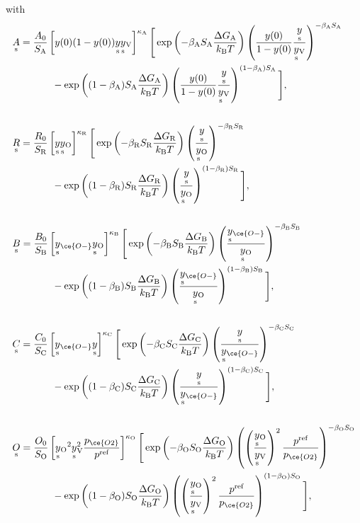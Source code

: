 \documentclass{article}
\numberwithin{equation}{section}
\newcommand{\us}[1]{\underset{\textrm{s}}{#1}{}}
\def\kB{k_\mathrm{B}}
\newcommand{\OO}{{\ce{O2}}}
\def\ys{\us y}
\newcommand{\ysV}{\us y_{\textrm{V}}}
\newcommand{\yOmin}{\us y_{\ce{O-}}}
\def\y0{{y(0)}}
\def\yOs{{\us y_\textrm{O}}}
\def\A0{A_0}
\def\B0{B_0}
\def\C0{C_0}
\def\R0{R_0}
\def\K0{O_0}
\def\DGA{\Delta G_\textrm{A}  }
\def\DGB{\Delta G_\textrm{B}  }
\def\DGC{\Delta G_\textrm{C}  }
\def\DGR{\Delta G_\textrm{R}  }
\def\DGO{\Delta G_\textrm{O}  }
\def\betaA{\beta_\textrm{A}}
\def\betaB{\beta_\textrm{B}}
\def\betaC{\beta_\textrm{C}}
\def\betaR{\beta_\textrm{R}}
\def\betaO{\beta_\textrm{O}}
\def\SA{S_\textrm{A}}
\def\SB{S_\textrm{B}}
\def\SC{S_\textrm{C}}
\def\SR{S_\textrm{R}}
\def\SO{S_\textrm{O}}
\newcommand{\kaA}{{\kappa_\textrm{A}}}
\newcommand{\kaB}{{\kappa_\textrm{B}}}
\newcommand{\kaC}{{\kappa_\textrm{C}}}
\newcommand{\kaR}{{\kappa_\textrm{R}}}
\newcommand{\kaO}{{\kappa_\textrm{O}}}
\def\REF{\textrm{ref}}
\begin{document}
with
\begin{subequations}
\begin{align}
&\us A
=
\frac{\A0}{\SA}
\left[
    y(0) (1-y(0)) \ys \ysV  
\right]^\kaA
\Bigg[
	\exp
	\left(
		{-\betaA \SA \frac{\DGA}{\kB T}}
	\right)
	\left(
		\frac{\y0}{1 - \y0}
		\frac{\ys}{\ysV}
	\right)^{-\betaA \SA}
\\ \nonumber
	&\quad \quad \quad \quad	
	-
	\exp
	\left(
		{(1-\betaA) \SA \frac{\DGA}{\kB T}}
	\right)
	\left(
		\frac{\y0}{1 - \y0 }
		\frac{\ys}{\ysV}
	\right)^{(1-\betaA) \SA}
\Bigg],
\\ \nonumber
\\
&\us R
=
\frac{\R0}{\SR}
\left[
  \ys \yOs 
\right]^\kaR
\Bigg[
	\exp
	\left(
		{-\betaR \SR \frac{\DGR}{\kB T}}
	\right)
	\left(
		\frac{\ys}{\yOs}
	\right)^{-\betaR \SR}
\\ \nonumber
	& \quad \quad \quad \quad	
	-
	\exp
	\left(
		{(1 - \betaR) \SR \frac{\DGR}{\kB T}}
	\right)
	\left(
		\frac{\ys}{\yOs}
	\right)^{(1-\betaR) \SR}
\Bigg],
\\ \nonumber
\\
&\us B
=
\frac{\B0}{\SB}
\left[
  \yOmin \yOs 
\right]^\kaB
\Bigg[
	\exp
	\left(
		{-\betaB \SB \frac{\DGB}{\kB T}}
	\right)
	\left(
		\frac{\yOmin}{\yOs}
	\right)^{-\betaB \SB}
\\ \nonumber
	& \quad \quad \quad \quad	
	-
	\exp
	\left(
		{(1 - \betaB) \SB \frac{\DGB}{\kB T}}
	\right)
	\left(
		\frac{\yOmin}{\yOs}
	\right)^{(1-\betaB) \SB}
\Bigg],
\\ \nonumber
\\
&\us C
=
\frac{\C0}{\SC}
\left[
  \yOmin \ys 
\right]^\kaC
\Bigg[
	\exp
	\left(
		{-\betaC \SC \frac{\DGC}{\kB T}}
	\right)
	\left(
		\frac{\ys}{\yOmin}
	\right)^{-\betaC \SC}
\\ \nonumber
	& \quad \quad \quad \quad	
	-
	\exp
	\left(
		{(1 - \betaC) \SC \frac{\DGC}{\kB T}}
	\right)
	\left(
		\frac{\ys}{\yOmin}
	\right)^{(1-\betaC) \SC}
\Bigg],
\\ \nonumber
\\
&\us O
=
\frac{\K0}{\SO}
\left[
    \yOs^2 \ysV^2 \frac{p_\OO}{p^\REF}
\right]^\kaO
\Bigg[
	\exp
	\left(
		{-\betaO \SO \frac{\DGO}{\kB T}}
	\right)
	\left(
		\left(
			\frac{\yOs}{\ysV}
		\right)^2
   \frac{p^\REF}{p_\OO}
	\right)^{-\betaO \SO}
\\ \nonumber
	&\quad \quad \quad \quad	
	-
	\exp
	\left(
		{(1-\betaO) \SO \frac{\DGO}{\kB T}}
	\right)
	\left(
		\left(
			\frac{\yOs}{\ysV}
		\right)^2
    \frac{p^\REF}{p_\OO}
	\right)^{(1 - \betaO) \SO}
\Bigg],
\end{align}
\end{subequations}
\end{document}
